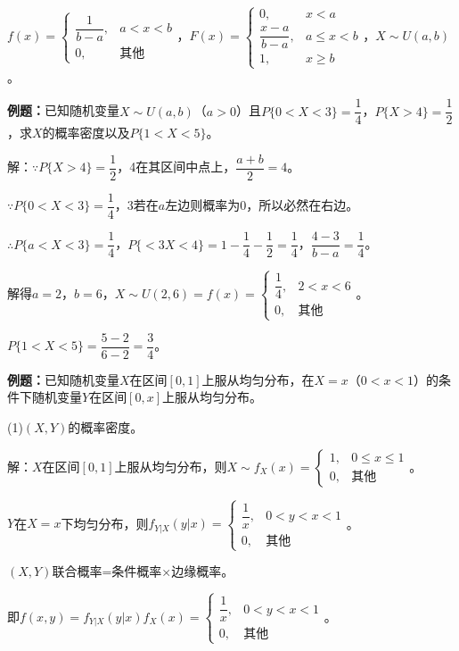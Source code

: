 $f(x)=\left\{\begin{array}{ll}
    \dfrac{1}{b-a}, & a<x<b \\
    0, & \text{其他}
\end{array}\right.$，$F(x)=\left\{\begin{array}{ll}
    0, & x<a \\
    \dfrac{x-a}{b-a}, & a\leqslant x<b \\
    1, & x\geqslant b
\end{array}\right.$，$X\sim U(a,b)$。

\textbf{例题：}已知随机变量$X\sim U(a,b)$（$a>0$）且$P\{0<X<3\}=\dfrac{1}{4}$，$P\{X>4\}=\dfrac{1}{2}$，求$X$的概率密度以及$P\{1<X<5\}$。

解：$\because P\{X>4\}=\dfrac{1}{2}$，4在其区间中点上，$\dfrac{a+b}{2}=4$。

$\because P\{0<X<3\}=\dfrac{1}{4}$，$3$若在$a$左边则概率为0，所以必然在右边。

$\therefore P\{a<X<3\}=\dfrac{1}{4}$，$P\{<3X<4\}=1-\dfrac{1}{4}-\dfrac{1}{2}=\dfrac{1}{4}$，$\dfrac{4-3}{b-a}=\dfrac{1}{4}$。

解得$a=2$，$b=6$，$X\sim U(2,6)=f(x)=\left\{\begin{array}{ll}
    \dfrac{1}{4}, & 2<x<6 \\
    0, & \text{其他}
\end{array}\right.$。

$P\{1<X<5\}=\dfrac{5-2}{6-2}=\dfrac{3}{4}$。

\textbf{例题：}已知随机变量$X$在区间$[0,1]$上服从均匀分布，在$X=x$（$0<x<1$）的条件下随机变量$Y$在区间$[0,x]$上服从均匀分布。

(1)$(X,Y)$的概率密度。

解：$X$在区间$[0,1]$上服从均匀分布，则$X\sim f_X(x)=\left\{\begin{array}{ll}
    1, & 0\leqslant x\leqslant1 \\
    0, & \text{其他}
\end{array}\right.$。

$Y$在$X=x$下均匀分布，则$f_{Y|X}(y|x)=\left\{\begin{array}{ll}
    \dfrac{1}{x}, & 0<y<x<1 \\
    0, & \text{其他}
\end{array}\right.$。

$(X,Y)$联合概率=条件概率×边缘概率。

即$f(x,y)=f_{Y|X}(y|x)f_X(x)=\left\{\begin{array}{ll}
    \dfrac{1}{x}, & 0<y<x<1 \\
    0, & \text{其他}
\end{array}\right.$。

